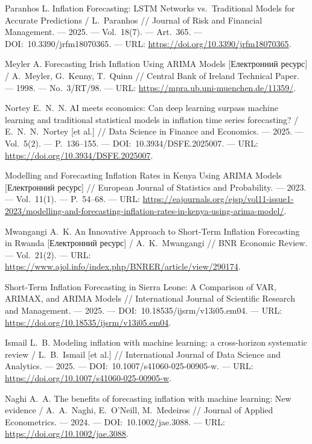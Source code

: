 \documentclass[a4paper,ukrainian,oneside]{extreport}
\begin{document}
\begin{enumerate}[label={[\arabic*]}, leftmargin=0pt, itemindent=0pt, labelindent=0pt]
\item Paranhos L. Inflation Forecasting: LSTM Networks vs.\ Traditional Models for Accurate Predictions / L.~Paranhos // Journal of Risk and Financial Management. --- 2025. --- Vol.~18(7). --- Art.~365. --- DOI:~10.3390/jrfm18070365. --- URL: \url{https://doi.org/10.3390/jrfm18070365}.

\item Meyler A. Forecasting Irish Inflation Using ARIMA Models [Електронний ресурс] / A.~Meyler, G.~Kenny, T.~Quinn // Central Bank of Ireland Technical Paper. --- 1998. --- No.~3/RT/98. --- URL: \url{https://mpra.ub.uni-muenchen.de/11359/}.

\item Nortey E.~N.~N. AI meets economics: Can deep learning surpass machine learning and traditional statistical models in inflation time series forecasting? / E.~N.~N.~Nortey [et al.] // Data Science in Finance and Economics. --- 2025. --- Vol.~5(2). --- P.~136--155. --- DOI:~10.3934/DSFE.2025007. --- URL: \url{https://doi.org/10.3934/DSFE.2025007}.

\item Modelling and Forecasting Inflation Rates in Kenya Using ARIMA Models [Електронний ресурс] // European Journal of Statistics and Probability. --- 2023. --- Vol.~11(1). --- P.~54--68. --- URL: \url{https://eajournals.org/ejsp/vol11-issue1-2023/modelling-and-forecasting-inflation-rates-in-kenya-using-arima-model/}.

\item Mwangangi A.~K. An Innovative Approach to Short-Term Inflation Forecasting in Rwanda [Електронний ресурс] / A.~K.~Mwangangi // BNR Economic Review. --- Vol.~21(2). --- URL: \url{https://www.ajol.info/index.php/BNRER/article/view/290174}.

\item Short-Term Inflation Forecasting in Sierra Leone: A Comparison of VAR, ARIMAX, and ARIMA Models // International Journal of Scientific Research and Management. --- 2025. --- DOI:~10.18535/ijsrm/v13i05.em04. --- URL: \url{https://doi.org/10.18535/ijsrm/v13i05.em04}.

\item Ismail L.~B. Modeling inflation with machine learning: a cross-horizon systematic review / L.~B.~Ismail [et al.] // International Journal of Data Science and Analytics. --- 2025. --- DOI:~10.1007/s41060-025-00905-w. --- URL: \url{https://doi.org/10.1007/s41060-025-00905-w}.

\item Naghi A.~A. The benefits of forecasting inflation with machine learning: New evidence / A.~A.~Naghi, E.~O'Neill, M.~Medeiros // Journal of Applied Econometrics. --- 2024. --- DOI:~10.1002/jae.3088. --- URL: \url{https://doi.org/10.1002/jae.3088}.


\end{enumerate}
\end{document}
